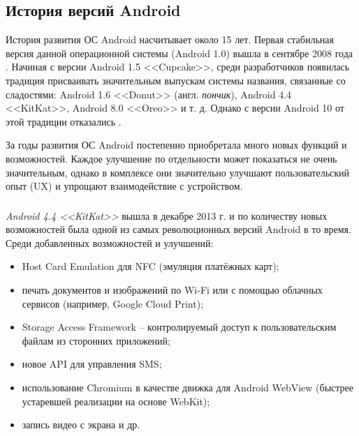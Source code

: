 \subsection{История версий Android}
\label{sub:android_platform:history}

История развития ОС Android насчитывает около 15 лет.
Первая стабильная версия данной операционной системы (Android 1.0) вышла в сентябре 2008 года \cite{android_first_release}.
Начиная с версии Android 1.5 <<Cupcake>>, среди разработчиков появилась традиция присваивать значительным выпускам системы названия, связанные со сладостями: Android 1.6 <<Donut>> (англ. \textit{пончик}), Android 4.4 <<KitKat>>, Android 8.0 <<Oreo>> и т. д.
Однако с версии Android 10 от этой традиции отказались \cite{android_codenames}.

За годы развития ОС Android постепенно приобретала много новых функций и возможностей.
Каждое улучшение по отдельности может показаться не очень значительным, однако в комплексе они значительно улучшают пользовательский опыт (UX) и упрощают взаимодействие с устройством.


\subsubsection{}
\label{subsub:android_platform:history:kitkat}

\textit{Android 4.4 <<KitKat>>} вышла в декабре 2013 г. \cite{android_release_notes} и по количеству новых возможностей была одной из самых революционных версий Android в то время.
Среди добавленных возможностей и улучшений:
\begin{itemize}
	\item Host Card Emulation для NFC (эмуляция платёжных карт);
	\item печать документов и изображений по Wi-Fi или с помощью облачных сервисов (например, Google Cloud Print);
	\item Storage Access Framework -- контролируемый доступ к пользовательским файлам из сторонних приложений;
	\item новое API для управления SMS;
	\item использование Chromium в качестве движка для Android WebView (быстрее устаревшей реализации на основе WebKit);
	\item запись видео с экрана и др. \cite{android_kitkat}
\end{itemize}


\subsubsection{}
\label{subsub:android_platform:history:lollipop}

